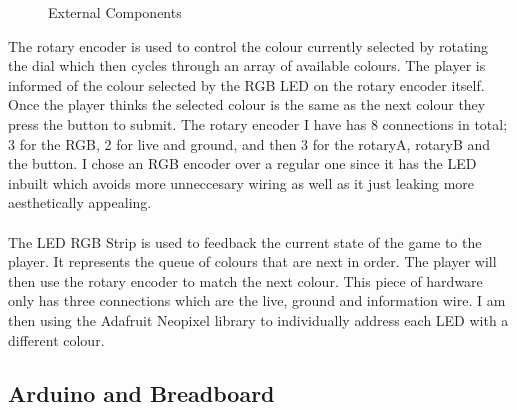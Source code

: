 \documentclass{article}
\begin{document}
\begin{figure}[ht]%
    \centering
    \qquad
    \caption{External Components}%
    \label{fig:external_component}%
\end{figure}

The rotary encoder is used to control the colour currently selected by rotating the dial which then cycles through an array of available colours. The player is informed of the colour selected by the RGB LED on the rotary encoder itself. Once the player thinks the selected colour is the same as the next colour they press the button to submit. The rotary encoder I have has 8 connections in total; 3 for the RGB, 2 for live and ground, and then 3 for the rotaryA, rotaryB and the button. I chose an RGB encoder over a regular one since it has the LED inbuilt which avoids more unneccesary wiring as well as it just leaking more aesthetically appealing.
\\
\\
The LED RGB Strip is used to feedback the current state of the game to the player. It represents the queue of colours that are next in order. The player will then use the rotary encoder to match the next colour. This piece of hardware only has three connections which are the live, ground and information wire. I am then using the Adafruit Neopixel library to individually address each LED with a different colour.

\subsection{Arduino and Breadboard}
\end{document}

